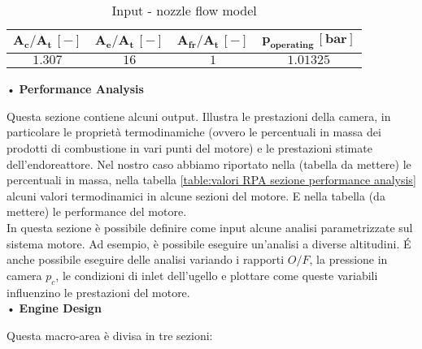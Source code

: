 \begin{itemize}
\begin{table}[H]
\centering
\begin{tabular}{|c|c|c|c|}
\hline
$\bm{A_c / A_t \, [-]}$ & $\bm{A_e / A_t \, [-]}$ & $\bm{A_{fr}/A_{t} \, [-]}$ & $\bm{p_{operating} \, [bar]}$  \\
\hline
$1.307$ & $16$ & $1$ & $1.01325$ \\
\hline
\end{tabular}
\caption{Input - nozzle flow model}
\label{table:nozzle_model}
\end{table}
\end{itemize}

• \textbf{Performance Analysis}

Questa sezione contiene alcuni output. Illustra le prestazioni della camera, in particolare le proprietà termodinamiche (ovvero le percentuali in massa dei prodotti di combustione in vari punti del motore) e le prestazioni stimate dell'endoreattore. Nel nostro caso abbiamo riportato nella (tabella da mettere) le percentuali in massa, nella tabella \autoref{table:valori RPA sezione performance analysis} alcuni valori termodinamici in alcune sezioni del motore. E nella tabella (da mettere) le performance del motore.\\
In questa sezione è possibile definire come input alcune analisi parametrizzate sul sistema motore. Ad esempio, è possibile eseguire un'analisi a diverse altitudini. \'E anche possibile eseguire delle analisi variando i rapporti $O/F$, la pressione in camera $p_c$, le condizioni di inlet dell'ugello e plottare come queste variabili influenzino le prestazioni del motore.
\\
• \textbf{Engine Design}

Questa macro-area è divisa in tre sezioni: 

